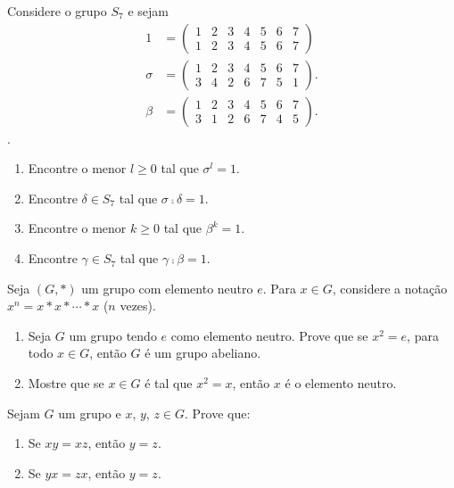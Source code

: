 \documentclass[12pt]{exam}
\begin{document}
\questao{} Considere o grupo $S_7$ e sejam
\begin{align*}
    1 &= \begin{pmatrix}
        1 & 2 & 3 & 4 & 5 & 6 & 7\\
        1 & 2 & 3 & 4 & 5 & 6 & 7
    \end{pmatrix}\\
    \sigma &= \begin{pmatrix}
            1 & 2 & 3 & 4 & 5 & 6 & 7\\
            3 & 4 & 2 & 6 & 7 & 5 & 1
        \end{pmatrix}.\\
    \beta &= \begin{pmatrix}
            1 & 2 & 3 & 4 & 5 & 6 & 7\\
            3 & 1 & 2 & 6 & 7 & 4 & 5
        \end{pmatrix}.
\end{align*}.
\begin{enumerate}[label=({\alph*})]
    \item Encontre o menor $l \ge 0$ tal que $\sigma^l = 1$.
    \item Encontre $\delta \in S_7$ tal que $\sigma\comp\delta = 1$.
    \item Encontre o menor $k \ge 0$ tal que $\beta^k = 1$.
    \item Encontre $\gamma \in S_7$ tal que $\gamma\comp\beta = 1$.
\end{enumerate}

\vspace{.3cm}

\questao{} Seja $(G,*)$ um grupo com elemento neutro $e$. Para $x\in
G$, considere a nota{\c c}{\~a}o $x^n=x*x*\cdots *x$ ($n$ vezes).
\begin{enumerate}[label=({\alph*})]
\item Seja $G$ um grupo tendo $e$ como elemento neutro. Prove que se
$x^2=e$, para todo $x\in G$, ent{\~a}o $G$ {\'e} um grupo abeliano.
\item Mostre que se $x\in G$ {\'e} tal que $x^2=x$, ent{\~a}o $x$ {\'e} o elemento neutro.
\end{enumerate}

\vspace{.3cm}

\questao{} Sejam $G$ um grupo e $x$, $y$, $z \in G$. Prove que:
\begin{enumerate}[label=({\alph*})]
    \item Se $xy = xz$, ent\~ao $y = z$.
    \item Se $yx = zx$, ent\~ao $y = z$.
\end{enumerate}

\vspace{.3cm}
\end{document}
